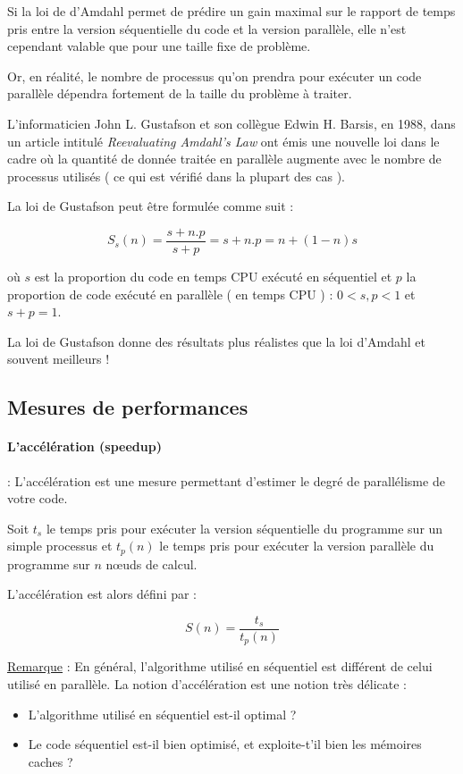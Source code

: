 \documentclass[fleqn,11pt]{article}
\begin{document}
Si la loi de d'Amdahl permet de prédire un gain maximal sur le rapport de temps pris entre la version séquentielle du code
et la version parallèle, elle n'est cependant valable que pour une taille fixe de problème.

Or, en réalité, le nombre de processus qu'on prendra pour exécuter un code parallèle dépendra fortement de la taille du problème
à traiter. 

L'informaticien John L. Gustafson et son collègue Edwin H. Barsis, en 1988, dans un article intitulé \textsl{Reevaluating Amdahl's Law}
ont émis une nouvelle loi dans le cadre où la quantité de donnée traitée en parallèle augmente avec le nombre de processus utilisés ( ce qui est vérifié
dans la plupart des cas ).

La loi de Gustafson peut être formulée comme suit :

\begin{equation}
 S_{s}(n) = \frac{s+n.p}{s+p} = s + n.p = n + (1-n)s
\end{equation}

où $s$ est la proportion du code en temps CPU exécuté en séquentiel et $p$ la proportion de code exécuté en parallèle ( en temps CPU ) :
$0 < s,p < 1$ et $s+p=1$.

La loi de Gustafson donne des résultats plus réalistes que la loi d'Amdahl et souvent meilleurs !

\subsection{Mesures de performances}

\paragraph{L'accélération (speedup)} : L'accélération est une mesure permettant d'estimer le degré de 
parallélisme de votre code.

Soit $t_{s}$ le temps pris pour exécuter la version séquentielle du programme sur un simple processus
et $t_{p}(n)$ le temps pris pour exécuter la version parallèle du programme sur $n$ n{\oe}uds de calcul.

L'accélération est alors défini par :

\begin{equation}
 S(n) = \frac{t_{s}}{t_{p}(n)}
\end{equation}

\underline{Remarque} : En général, l'algorithme utilisé en séquentiel est différent de celui utilisé
en parallèle. La notion d'accélération est une notion très délicate : 
\begin{itemize}
 \item L'algorithme utilisé en séquentiel est-il optimal ? 
 \item Le code séquentiel est-il bien optimisé, et exploite-t'il bien les mémoires caches ?
\end{itemize}
\end{document}
